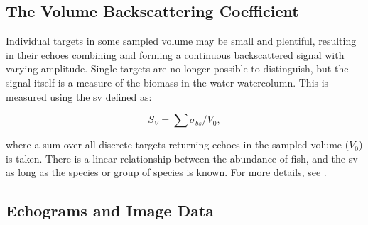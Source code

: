 \subsection{The Volume Backscattering Coefficient}
    Individual targets in some sampled volume may be small and plentiful, resulting in their echoes combining and forming a continuous backscattered signal with varying amplitude. Single targets are no longer possible to distinguish, but the signal itself is a measure of the biomass in the water watercolumn. This is measured using the \gls{sv} defined as:
    
    \begin{equation}
        S_{V} = \sum \sigma_{bs} / V_{0},
    \end{equation}
    
    where a sum over all discrete targets returning echoes in the sampled volume ($V_{0}$) is taken. There is a linear relationship between the abundance of fish, and the \gls{sv} as long as the species or group of species is known. For more details, see \citet{simmonds2008fisheries}.


    
    
    


\subsection{Echograms and Image Data} \label{echosounder and image data acoustic }

